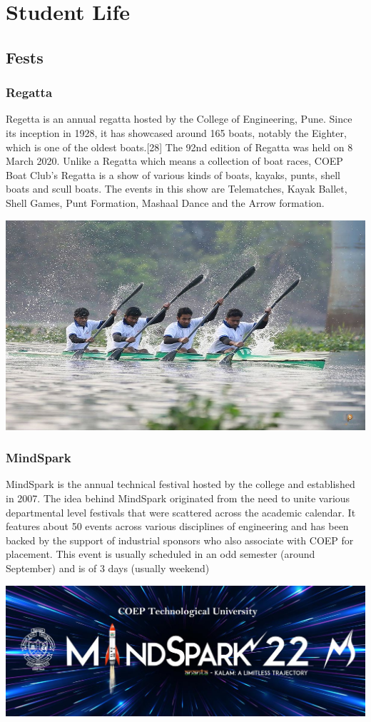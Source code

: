 \documentclass{article}
\begin{document}
\section{Student Life}
\subsection{Fests}
\subsubsection{Regatta}
Regetta is an annual regatta hosted by the College of Engineering, Pune. Since its inception in 1928, it has showcased around 165 boats, notably the Eighter, which is one of the oldest boats.[28] The 92nd edition of Regatta was held on 8 March 2020. Unlike a Regatta which means a collection of boat races, COEP Boat Club's Regatta is a show of various kinds of boats, kayaks, punts, shell boats and scull boats. The events in this show are Telematches, Kayak Ballet, Shell Games, Punt Formation, Mashaal Dance and the Arrow formation.
\begin{center}
  \includegraphics[width=0.7\linewidth]{Regatta649.jpg}
  \label{fig:3} 
\end{center}
\subsubsection{MindSpark}
MindSpark is the annual technical festival hosted by the college and established in 2007. The idea behind MindSpark originated from the need to unite various departmental level festivals that were scattered across the academic calendar. It features about 50 events across various disciplines of engineering and has been backed by the support of industrial sponsors who also associate with COEP for placement. This event is usually scheduled in an odd semester (around September) and is of 3 days (usually weekend)
\begin{center}
  \includegraphics[width=0.7\linewidth]{MindSpark.jpg}
  \label{fig:4} 
\end{center}
\end{document}
